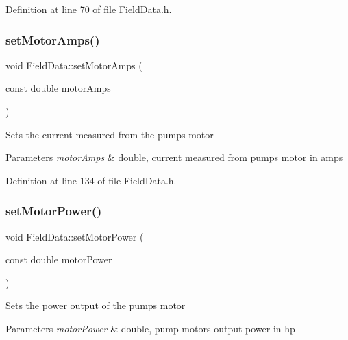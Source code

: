 Definition at line 70 of file Field\+Data.\+h.

\mbox{\label{class_field_data_a9139b100e363d8a632669ac5d6ee7152}} 
\subsubsection{\texorpdfstring{set\+Motor\+Amps()}{setMotorAmps()}}
{\footnotesize\ttfamily void Field\+Data\+::set\+Motor\+Amps (\begin{DoxyParamCaption}\item[{const double}]{motor\+Amps }\end{DoxyParamCaption})\hspace{0.3cm}{\ttfamily [inline]}}

Sets the current measured from the pump\textquotesingle{}s motor 
\begin{DoxyParams}{Parameters}
{\em motor\+Amps} & double, current measured from pump\textquotesingle{}s motor in amps \\
\hline
\end{DoxyParams}


Definition at line 134 of file Field\+Data.\+h.

\mbox{\label{class_field_data_a0263d25bc216482b0663b02d0af680a8}} 
\subsubsection{\texorpdfstring{set\+Motor\+Power()}{setMotorPower()}}
{\footnotesize\ttfamily void Field\+Data\+::set\+Motor\+Power (\begin{DoxyParamCaption}\item[{const double}]{motor\+Power }\end{DoxyParamCaption})\hspace{0.3cm}{\ttfamily [inline]}}

Sets the power output of the pump\textquotesingle{}s motor 
\begin{DoxyParams}{Parameters}
{\em motor\+Power} & double, pump motor\textquotesingle{}s output power in hp \\
\hline
\end{DoxyParams}


